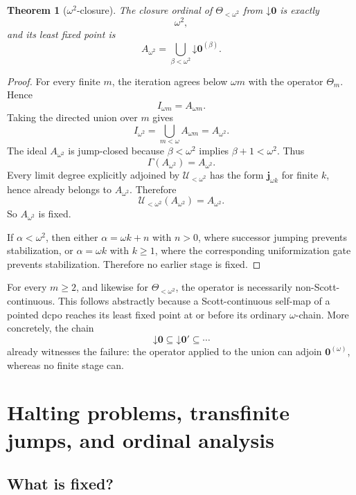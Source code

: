 \documentclass[11pt]{article}
\newtheorem{theorem}{Theorem}[section]
\theoremstyle{definition}
\theoremstyle{remark}
\newcommand{\down}{\mathord{\downarrow}}
\begin{document}
\begin{theorem}[$\omega^2$-closure]
\label{thm:omega-square}
The closure ordinal of $\Theta_{<\omega^2}$ from $\down\mathbf0$ is exactly
\[
\omega^2,
\]
and its least fixed point is
\begin{equation}
A_{\omega^2}
=
\bigcup_{\beta<\omega^2}\down\mathbf0^{(\beta)}.
\label{eq:A-omega-square}
\end{equation}
\end{theorem}

\begin{proof}
For every finite $m$, the iteration agrees below $\omega m$ with the operator $\Theta_m$. Hence
\[
I_{\omega m}=A_{\omega m}.
\]
Taking the directed union over $m$ gives
\[
I_{\omega^2}
=
\bigcup_{m<\omega}A_{\omega m}
=
A_{\omega^2}.
\]
The ideal $A_{\omega^2}$ is jump-closed because $\beta<\omega^2$ implies $\beta+1<\omega^2$. Thus
\[
\Gamma(A_{\omega^2})=A_{\omega^2}.
\]
Every limit degree explicitly adjoined by $\mathcal U_{<\omega^2}$ has the form $\mathbf j_{\omega k}$ for finite $k$, hence already belongs to $A_{\omega^2}$. Therefore
\[
\mathcal U_{<\omega^2}(A_{\omega^2})=A_{\omega^2}.
\]
So $A_{\omega^2}$ is fixed.

If $\alpha<\omega^2$, then either $\alpha=\omega k+n$ with $n>0$, where successor jumping prevents stabilization, or $\alpha=\omega k$ with $k\geq1$, where the corresponding uniformization gate prevents stabilization. Therefore no earlier stage is fixed.
\end{proof}

For every $m\geq2$, and likewise for $\Theta_{<\omega^2}$, the operator is necessarily non-Scott-continuous. This follows abstractly because a Scott-continuous self-map of a pointed dcpo reaches its least fixed point at or before its ordinary $\omega$-chain. More concretely, the chain
\[
\down\mathbf0
\subseteq
\down\mathbf0'
\subseteq\cdots
\]
already witnesses the failure: the operator applied to the union can adjoin $\mathbf0^{(\omega)}$, whereas no finite stage can.

\section{Halting problems, transfinite jumps, and ordinal analysis}

\subsection{What is fixed?}
\end{document}
